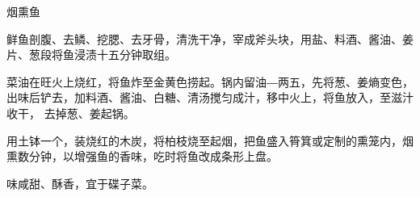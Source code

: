 \begin{recipe}{烟熏鱼}

\ingredients


\cooking

\step 鲜鱼剖腹、去鳞、挖腮、去牙骨，清洗干净，宰成斧头块，用盐、料酒、酱油、姜
片、葱段将鱼浸渍十五分钟取组。

\step 菜油在旺火上烧红，将鱼炸至金黄色捞起。锅内留油―两五，先将葱、姜熵变色，
出味后铲去，加料酒、酱油、白糖、清汤搅匀成汁，移中火上，将鱼放入，至滋汁收干，
去掉葱、姜起锅。

\step 用土钵一个，装烧红的木炭，将柏枝烧至起烟，把鱼盛入筲箕或定制的熏笼内，烟
熏数分钟，以增强鱼的香味，吃时将鱼改成条形上盘。

\notes

味咸甜、酥香，宜于碟子菜。

\end{recipe}

